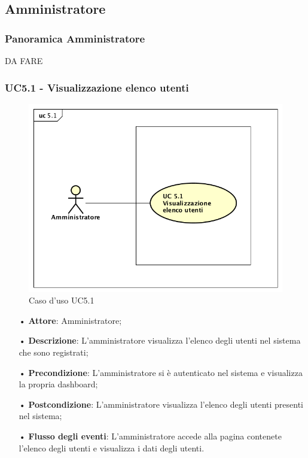\subsection{Amministratore}
\subsubsection{Panoramica Amministratore}
DA FARE


\subsubsection{UC5.1 - Visualizzazione elenco utenti}

\begin{figure}[H]
\centering
\includegraphics[width=17cm]{img/UC51.png} 
\caption{Caso d'uso UC5.1}
\end{figure}


\begin{itemize}
\item[•] \textbf{Attore}: Amministratore;

\item[•] \textbf{Descrizione}: L'amministratore visualizza l'elenco degli utenti nel sistema che sono registrati;

\item[•] \textbf{Precondizione}: L'amministratore si è autenticato nel sistema e visualizza la propria dashboard;

\item[•] \textbf{Postcondizione}: L'amministratore visualizza l'elenco degli utenti presenti nel sistema;

\item[•] \textbf{Flusso degli eventi}: L'amministratore accede alla pagina contenete l'elenco degli utenti e visualizza i dati degli utenti. 
\end{itemize}

